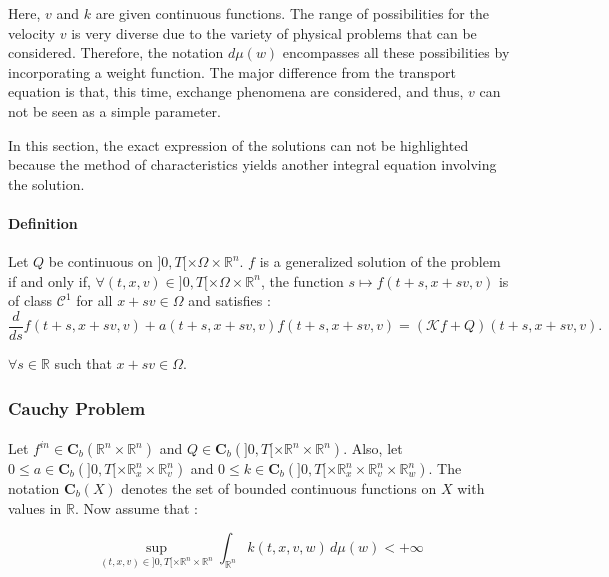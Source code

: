 \documentclass[a4paper, 11pt]{article}
\begin{document}
Here, $v$ and $k$ are given continuous functions. The range of possibilities for the velocity $v$ is very diverse due to the variety of physical problems that can be considered. Therefore, the notation $d\mu(w)$ encompasses all these possibilities by incorporating a weight function. The major difference from the transport equation is that, this time, exchange phenomena are considered, and thus, $v$ can not be seen as a simple parameter.

In this section, the exact expression of the solutions can not be highlighted because the method of characteristics yields another integral equation involving the solution.


\paragraph{Definition}

Let $Q$ be continuous on $]0,T[\times \Omega \times \mathbb{R}^n$. $f$ is a generalized solution of the problem \cite{Boltzmann} if and only if, $\forall (t,x,v) \in ]0,T[\times \Omega \times \mathbb{R}^n$, the function $ s \mapsto f(t+s,x+sv,v) $	is of class $\mathcal{C}^1$ for all $x+sv \in \Omega$ and satisfies :
\[\frac{d}{ds}f(t+s,x+sv,v) +a(t+s,x+sv,v)f(t+s,x+sv,v) = (\mathcal{K}f+ Q)(t+s,x+sv,v). 
\]

\begin{flushleft} $\forall s \in \mathbb{R}$ such that $x +sv \in \Omega$.
\end{flushleft}

\subsubsection{Cauchy Problem}
\paragraph{}



Let $f^{in} \in \mathbf{C}_b(\mathbb{R}^n \times \mathbb{R}^n)$ and $Q \in \mathbf{C}_b(]0,T[ \times \mathbb{R}^n \times \mathbb{R}^n)$. Also, let $0 \leq a \in \mathbf{C}_b(]0,T[ \times \mathbb{R}_x^n \times \mathbb{R}_v^n)$ and $0 \leq k \in \mathbf{C}_b(]0,T[ \times \mathbb{R}_x^n \times \mathbb{R}_v^n \times \mathbb{R}_w^n)$. The notation $\mathbf{C}_b(X)$ denotes the set of bounded continuous functions on $X$ with values in $\mathbb{R}$.
\medbreak
Now assume that :  

\[ \underset{(t,x,v) \in ]0,T[ \times \mathbb{R}^n \times \mathbb{R}^n}{\sup} \int_{\mathbb{R}^n} k(t,x,v,w) \, d\mu(w) < +\infty \]
\end{document}
